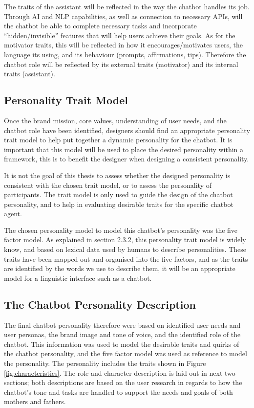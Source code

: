     The traits of the assistant will be reflected in the way the chatbot handles its job. Through AI and NLP capabilities, as well as connection to necessary APIs, will the chatbot be able to complete necessary tasks and incorporate “hidden/invisible” features that will help users achieve their goals. As for the motivator traits, this will be reflected in how it encourages/motivates users, the language its using, and its behaviour (prompts, affirmations, tips). Therefore the chatbot role will be reflected by its external traits (motivator) and its internal traits (assistant).
    
\vspace{5mm}

    \subsection{Personality Trait Model}
    Once the brand mission, core values, understanding of user needs, and the chatbot role have been identified, designers should find an appropriate personality trait model to help put together a dynamic personality for the chatbot. It is important that this model will be used to place the desired personality within a framework, this is to benefit the designer when designing a consistent personality. 
    
    It is not the goal of this thesis to assess whether the designed personality is consistent with the chosen trait model, or to assess the personality of participants. The trait model is only used to guide the design of the chatbot personality, and to help in evaluating desirable traits for the specific chatbot agent. 
    
    The chosen personality model to model this chatbot's personality was the five factor model. As explained in section 2.3.2, this personality trait model is widely know, and based on lexical data used by humans to describe personalities. These traits have been mapped out and organised into the five factors, and as the traits are identified by the words we use to describe them, it will be an appropriate model for a linguistic interface such as a chatbot.
    
\vspace{5mm}

    \subsection{The Chatbot Personality Description}
    The final chatbot personality therefore were based on identified user needs and user personas, the brand image and tone of voice, and the identified role of the chatbot. This information was used to model the desirable traits and quirks of the chatbot personality, and the five factor model was used as reference to model the personality. The personality includes the traits shown in Figure \ref{fig:characteristics}. The role and character description is laid out in next two sections; both descriptions are based on the user research in regards to how the chatbot's tone and tasks are handled to support the needs and goals of both mothers and fathers.
    
